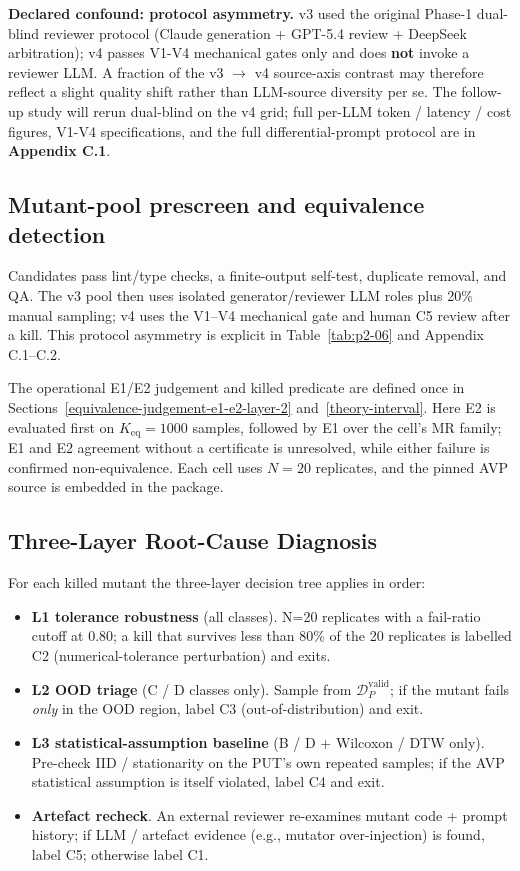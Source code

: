 \documentclass[review,12pt,authoryear]{elsarticle}
\providecommand{\tightlist}{\setlength{\itemsep}{0pt}\setlength{\parskip}{0pt}}
\begin{document}
\textbf{Declared confound: protocol asymmetry.} v3 used the
original Phase-1 dual-blind reviewer protocol (Claude generation +
GPT-5.4 review + DeepSeek arbitration); v4 passes V1-V4 mechanical gates
only and does \textbf{not} invoke a reviewer LLM. A fraction of the v3 $\to$
v4 source-axis contrast may therefore reflect a slight quality shift
rather than LLM-source diversity per se. The follow-up study will rerun
dual-blind on the v4 grid; full per-LLM token / latency / cost figures,
V1-V4 specifications, and the full differential-prompt protocol are in
\textbf{Appendix C.1}.

\subsection{Mutant-pool prescreen and equivalence detection}\label{mutant-pool-prescreen-and-equivalence-detection}

Candidates pass lint/type checks, a finite-output self-test, duplicate
removal, and QA. The v3 pool then uses isolated generator/reviewer LLM
roles plus 20\% manual sampling; v4 uses the V1--V4 mechanical gate and
human C5 review after a kill. This protocol asymmetry is explicit in
Table~\ref{tab:p2-06} and Appendix C.1--C.2.

The operational E1/E2 judgement and killed predicate are defined once in
Sections~\ref{equivalence-judgement-e1-e2-layer-2}
and~\ref{theory-interval}. Here E2 is evaluated first on
\(K_{\mathrm{eq}}=1000\) samples, followed by E1 over the cell's MR
family; E1 and E2 agreement without a certificate is unresolved, while
either failure is confirmed non-equivalence. Each cell uses \(N=20\)
replicates, and the pinned AVP source is embedded in the package.

\subsection{Three-Layer Root-Cause Diagnosis}\label{lrca-three-layer-diagnosis}

For each killed mutant the three-layer decision tree applies in order:

\begin{itemize}
\tightlist
\item
  \textbf{L1 tolerance robustness} (all classes). N=20 replicates with a
  fail-ratio cutoff at 0.80; a kill that survives less than 80\% of the
  20 replicates is labelled C2 (numerical-tolerance perturbation) and
  exits.
\item
  \textbf{L2 OOD triage} (C / D classes only). Sample from
  $\mathcal{D}_P^{\mathrm{valid}}$; if the mutant fails \emph{only} in the OOD
  region, label C3 (out-of-distribution) and exit.
\item
  \textbf{L3 statistical-assumption baseline} (B / D + Wilcoxon / DTW
  only). Pre-check IID / stationarity on the PUT's own repeated samples;
  if the AVP statistical assumption is itself violated, label C4 and
  exit.
\item
  \textbf{Artefact recheck}. An external reviewer re-examines mutant
  code + prompt history; if LLM / artefact evidence (e.g., mutator
  over-injection) is found, label C5; otherwise label C1.
\end{itemize}
\end{document}
